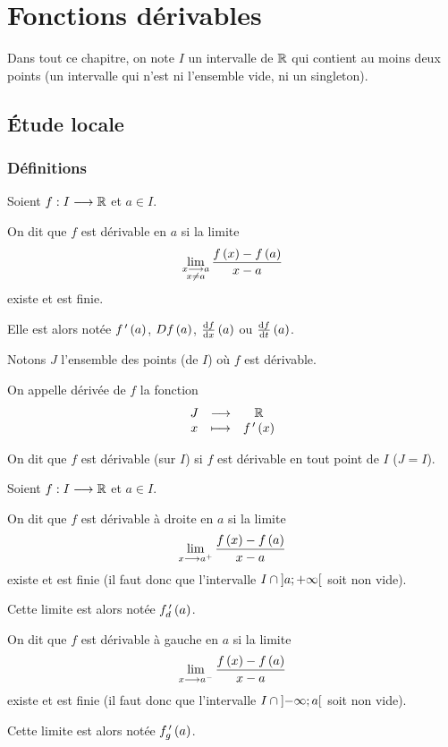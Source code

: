 \chapter{Fonctions dérivables}

\minitoc

Dans tout ce chapitre, on note \(I\) un intervalle de \(\mathbb{R}\) qui contient au moins deux points (\cad un intervalle qui n'est ni l'ensemble vide, ni un singleton).

\section{Étude locale}

\subsection{Définitions}

\begin{defi}[Dérivée]
Soient \(f:I\longrightarrow\mathbb{R}\) et \(a\in I\).

On dit que \(f\) est dérivable en \(a\) si la limite \[\lim_{\substack{x\longrightarrow a \\ x\not=a}}\dfrac{f\left(x\right)-f\left(a\right)}{x-a}\] existe et est finie.

Elle est alors notée \(f^{\,\prime}\left(a\right)\), \(D f\left(a\right)\), \(\odv{f}{x}\paren{a}\) ou \(\odv{f}{t}\paren{a}\).

Notons \(J\) l'ensemble des points (de \(I\)) où \(f\) est dérivable.

On appelle dérivée de \(f\) la fonction \[\begin{array}[t]{ccc}J & \longrightarrow & \mathbb{R} \\ x & \longmapsto & f^{\,\prime}\left(x\right)\end{array}\]

On dit que \(f\) est dérivable (sur \(I\)) si \(f\) est dérivable en tout point de \(I\) (\cad \(J=I\)).
\end{defi}

\begin{defi}
Soient \(f:I\longrightarrow\mathbb{R}\) et \(a\in I\).

On dit que \(f\) est dérivable à droite en \(a\) si la limite \[\lim_{x\longrightarrow a^+}\dfrac{f\left(x\right)-f\left(a\right)}{x-a}\] existe et est finie (il faut donc que l'intervalle \(I\cap\left]a;+\infty\right[\) soit non vide).

Cette limite est alors notée \(f_d^{\,\prime}\left(a\right)\).

On dit que \(f\) est dérivable à gauche en \(a\) si la limite \[\lim_{x\longrightarrow a^-}\dfrac{f\left(x\right)-f\left(a\right)}{x-a}\] existe et est finie (il faut donc que l'intervalle \(I\cap\left]-\infty;a\right[\) soit non vide).

Cette limite est alors notée \(f_g^{\,\prime}\left(a\right)\).
\end{defi}

